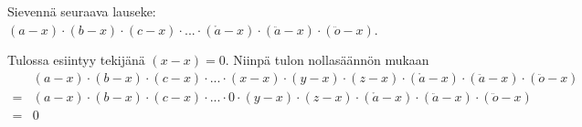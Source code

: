 \begin{tehtavasivu}
\begin{tehtava}
    Sievennä seuraava lauseke: $(a-x)\cdot(b-x)\cdot(c-x)\cdot...\cdot(\mathring{a}-x)\cdot(\ddot{a}-x)\cdot(\ddot{o}-x)$.
    \begin{vastaus}
        Tulossa esiintyy tekijänä $(x-x)=0$. Niinpä tulon nollasäännön mukaan
        \begin{align*}
            &(a-x)\cdot(b-x)\cdot(c-x)\cdot...\cdot(x-x)\cdot(y-x)\cdot(z-x)\cdot(\mathring{a}-x)\cdot(\ddot{a}-x)\cdot(\ddot{o}-x) \\
            =&(a-x)\cdot(b-x)\cdot(c-x)\cdot...\cdot 0\cdot(y-x)\cdot(z-x)\cdot(\mathring{a}-x)\cdot(\ddot{a}-x)\cdot(\ddot{o}-x) \\
            =&0
        \end{align*}
    \end{vastaus}
\end{tehtava}

\end{tehtavasivu}
